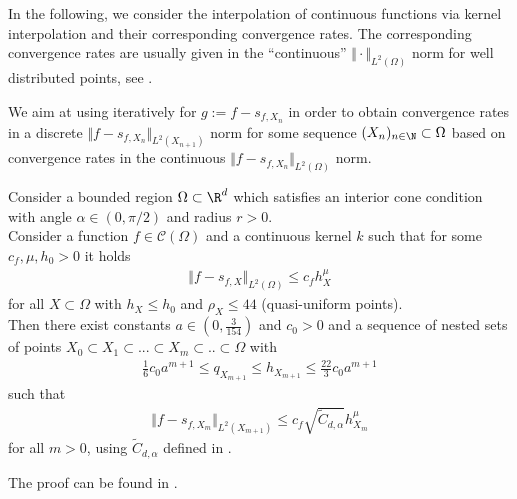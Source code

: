 \documentclass[a4paper, 10pt]{article}
\begin{document}
In the following,
we consider the interpolation of continuous functions via kernel interpolation and their corresponding convergence rates.
The corresponding convergence rates are usually given in the ``continuous'' $\Vert \cdot \Vert_{L^2(\Omega)}$ norm for well distributed points, see .
%

We aim at using  iteratively for $g := f - s_{f, X_n}$ in order to obtain convergence rates in a discrete $\Vert f - s_{f, X_n} \Vert_{L^2(X_{n+1})}$ norm 
for some sequence $(X_n)_{n \in \N} \subset \Omega$ based on convergence rates in the continuous $\Vert f - s_{f, X_n} \Vert_{L^2(\Omega)}$ norm.
%

\begin{prop}
\label{prop:disc_L2_from_cont_L2_new}
%
Consider a bounded region $\Omega \subset \R^d$ which satisfies an interior cone condition with angle $\alpha \in (0, \pi/2)$ and radius $r>0$. \\
Consider a function $f \in \mathcal{C}(\Omega)$ and a continuous kernel $k$ such that for some $c_f, \mu, h_0 > 0$ it holds
\begin{align*}
\Vert f - s_{f, X} \Vert_{L^2(\Omega)} \leq c_f h_X^{\mu}
\end{align*}
for all $X \subset \Omega$ with $h_X \leq h_0$ and $\rho_X \leq 44$ (quasi-uniform points). \\
%
%
%
%
Then there exist constants $a \in (0, \frac{3}{154})$ and $c_0 > 0$ and a sequence of nested sets of points $X_0 \subset X_1 \subset ... \subset X_m \subset .. \subset \Omega$ with 
\begin{align*}
\frac{1}{6} c_0 a^{m+1} \leq q_{X_{m+1}} \leq h_{X_{m+1}} \leq \frac{22}{3} c_0 a^{m+1}
\end{align*}
%
%
%
%
such that
\begin{align*}
\Vert f - s_{f, X_m} \Vert_{L^2(X_{m+1})} \leq c_f \sqrt{\tilde{C}_{d,\alpha}} h_{X_m}^{\mu}
\end{align*}
for all $m > 0$, using $\tilde{C}_{d,\alpha}$ defined in .
\end{prop}

The proof can be found in .
%
%
%




%
%
%
%
%
%
%
%
%
%







%
%
%


%
%
%
%
%
%
%
%
%
%
%
%
%
%
%
%
%
%
%
%
%
%
%
%
%
%
%
%
%
%
%
%
%
%
%
%
%
%
%
%
%
%
%
%
%
%
%
%
%
%
%
%
%
%
%
%
%
%
%
%
%
%
%
%
%
%
%
\end{document}
